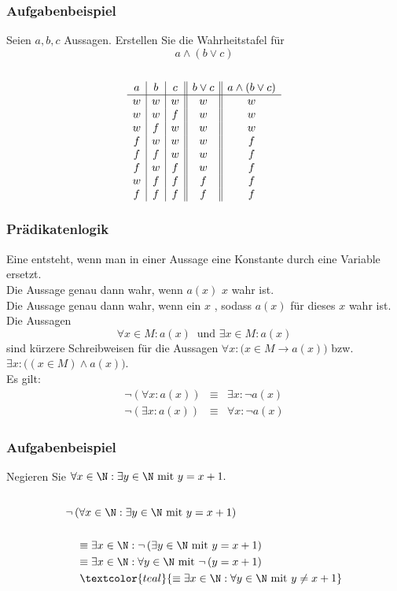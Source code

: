 \begin{frame}\frametitle{Aufgabenbeispiel}
Seien $a,b,c$  Aussagen.
Erstellen Sie die Wahrheitstafel für 
$$
	a\land (b \lor c)
$$\pause
{}\\
$$
	\begin{array}{c | c | c ||c|| c }
		a	&b	&c	&b \lor c& a\land (b \lor c)		\\ \hline
		w	&w	&w&w	& w							\\
		w	&w	&f	&w& w							\\
		w	&f	&w	&w& w							\\
		f	&w	&w	&w&f							\\
		f	&f	&w&w	&f						\\
		f	&w	&f	&w&f							\\
		w	&f	&f	&f& f							\\
		f	&f	&f	&f& f							\\
	\end{array}
$$
\end{frame}
%
\begin{frame}\frametitle{Prädikatenlogik}
	Eine  entsteht, wenn man in einer Aussage eine Konstante durch eine Variable ersetzt.\\[3mm]\pause
	Die Aussage 
	genau dann wahr, wenn $a(x)$  $x$ wahr ist.\\
		Die Aussage 
	genau dann wahr, wenn ein $x$ , sodass $a(x)$ für dieses $x$ wahr ist.\\[3mm]\pause
Die Aussagen
	$$
		\forall x\in M: a(x) \ \text{ und } \exists x \in M: a(x)
	$$
	sind kürzere Schreibweisen für die Aussagen
	$
		\forall x: \big(x\in M \rightarrow a(x) \big) $ bzw. $ \exists x: \big( (x\in M) \land a(x) \big)
	$.\\\pause
	Es gilt: \vspace{-3mm}
	\begin{eqnarray*}
		\neg( \forall x: a(x) ) 	&\equiv	& \exists x: \neg a(x)\\
		\neg( \exists x: a(x) )	& \equiv	& \forall x: \neg a(x)
	\end{eqnarray*}
\end{frame}
%
\begin{frame}\frametitle{Aufgabenbeispiel}
Negieren Sie $\forall x\in \N: \exists y\in \N \text{~mit~} y = x+1.$ \\\pause\vfill
{}\\
\begin{align*}
&\neg\left(\forall x\in \N: \exists y\in \N \text{~mit~} y = x+1 \right) \\
&\quad \\
&\quad \equiv \exists x\in \N: \neg \left(\exists y\in \N \text{~mit~} y = x+1 \right)\\
&\quad \equiv \exists x\in \N:  \forall y\in \N \text{~mit~} \neg \left(y = x+1 \right)\\
&\quad \hspace{1mm} \textcolor{teal}{\equiv \exists x\in \N:  \forall y\in \N \text{~mit~} y \ne x+1}
\end{align*}
\end{frame}
%
%
